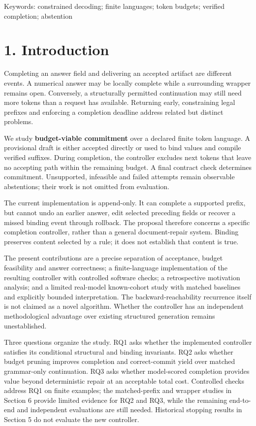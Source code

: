 \documentclass[
  12pt,
  a4paper,
]{article}
\begin{document}
Keywords: constrained decoding; finite languages; token budgets;
verified completion; abstention

\section{1. Introduction}\label{introduction}

Completing an answer field and delivering an accepted artifact are
different events. A numerical answer may be locally complete while a
surrounding wrapper remains open. Conversely, a structurally permitted
continuation may still need more tokens than a request has available.
Returning early, constraining legal prefixes and enforcing a completion
deadline address related but distinct problems.

We study \textbf{budget-viable commitment} over a declared finite token
language. A provisional draft is either accepted directly or used to
bind values and compile verified suffixes. During completion, the
controller excludes next tokens that leave no accepting path within the
remaining budget. A final contract check determines commitment.
Unsupported, infeasible and failed attempts remain observable
abstentions; their work is not omitted from evaluation.

The current implementation is append-only. It can complete a supported
prefix, but cannot undo an earlier answer, edit selected preceding
fields or recover a missed binding event through rollback. The proposal
therefore concerns a specific completion controller, rather than a
general document-repair system. Binding preserves content selected by a
rule; it does not establish that content is true.

The present contributions are a precise separation of acceptance, budget feasibility and answer correctness; a finite-language implementation of the resulting controller with controlled software checks; a retrospective motivation analysis; and a limited real-model known-cohort study with matched baselines and explicitly bounded interpretation. The backward-reachability recurrence itself is not claimed as a novel algorithm. Whether the controller has an independent methodological advantage over existing structured generation remains unestablished.

Three questions organize the study. RQ1 asks whether the implemented controller satisfies its conditional structural and binding invariants. RQ2 asks whether budget pruning improves completion and correct-commit yield over matched grammar-only continuation. RQ3 asks whether model-scored completion provides value beyond deterministic repair at an acceptable total cost. Controlled checks address RQ1 on finite examples; the matched-prefix and wrapper studies in Section 6 provide limited evidence for RQ2 and RQ3, while the remaining end-to-end and independent evaluations are still needed. Historical stopping results in Section 5 do not evaluate the new controller.
\end{document}
